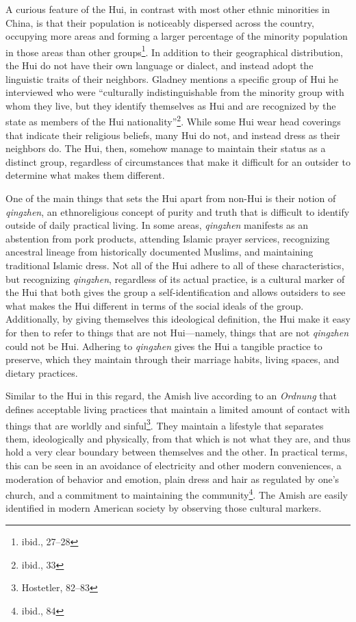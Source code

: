 A curious feature of the Hui, in contrast with most other ethnic minorities in
China, is that their population is noticeably dispersed across the country,
occupying more areas and forming a larger percentage of the minority population
in those areas than other groups\footnote{ibid., 27--28}. In addition to their
geographical distribution, the Hui do not have their own
language or dialect,
and instead adopt the linguistic traits of their neighbors. Gladney mentions a
specific group of Hui he interviewed who were ``culturally indistinguishable
from the minority group with whom they live, but they identify themselves as Hui
and are recognized by the state as members of the Hui
nationality''\footnote{ibid., 33}. While some Hui wear head coverings that
indicate their religious beliefs, many Hui do not, and instead dress as their
neighbors do. The Hui, then, somehow manage to maintain their status as a
distinct group, regardless of circumstances that make it difficult for an
outsider to determine what makes them different.

One of the main things that sets the Hui apart from non-Hui is their notion of
\textit{qingzhen}, an ethnoreligious concept of purity and truth that is
difficult to identify outside of daily practical living. In some areas,
\textit{qingzhen} manifests as an abstention from pork products, attending
Islamic prayer services, recognizing ancestral lineage from historically
documented Muslims, and maintaining traditional Islamic dress. Not all of the
Hui adhere to all of these characteristics, but recognizing \textit{qingzhen},
regardless of its actual practice, is a cultural marker of the Hui that both
gives the group a self-identification and allows outsiders to see what makes the
Hui different in terms of the social ideals of the group. Additionally, by
giving themselves this ideological definition, the Hui make it easy for then to
refer to things that are not Hui---namely, things that are not \textit{qingzhen}
could not be Hui. Adhering to \textit{qingzhen} gives the Hui a tangible
practice to preserve, which they maintain through their marriage habits, living
spaces, and dietary practices.

Similar to the Hui in this regard, the Amish live according to an
\textit{Ordnung} that defines acceptable living practices that maintain a
limited amount of contact with things that are worldly and
sinful\footnote{Hostetler, 82--83}. They maintain a lifestyle that separates
them, ideologically and physically, from that which is not what they are, and
thus hold a very clear boundary between themselves and the other. In practical
terms, this can be seen in an avoidance of electricity and other modern
conveniences, a moderation of behavior and emotion, plain dress and hair as
regulated by one's church, and a commitment to maintaining the
community\footnote{ibid., 84}.  The Amish are easily identified in modern
American society by observing those cultural markers.

